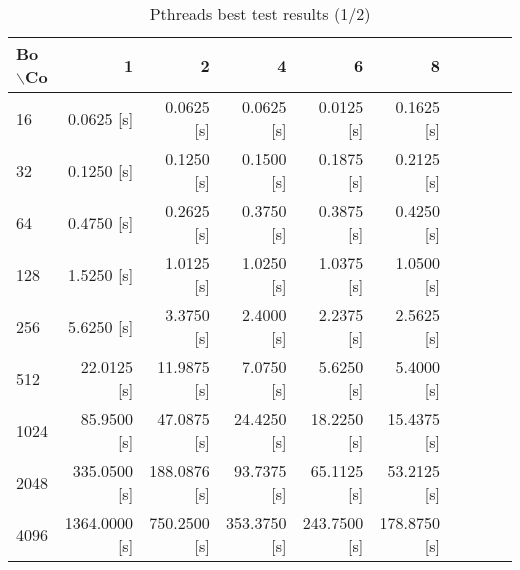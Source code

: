     \begin{table}[h!]
        \centering
        \small
        \begin{tabular}{|l|r|r|r|r|r|r|r|r|r|}
            \hline
            Bo $\backslash$Co & 1             & 2            & 4            & 6            & 8             \\\hline
            16                & 0.0625 [s]    & 0.0625 [s]   & 0.0625 [s]   & 0.0125 [s]   & 0.1625 [s]    \\\hline
            32                & 0.1250 [s]    & 0.1250 [s]   & 0.1500 [s]   & 0.1875 [s]   & 0.2125 [s]    \\\hline
            64                & 0.4750 [s]    & 0.2625 [s]   & 0.3750 [s]   & 0.3875 [s]   & 0.4250 [s]    \\\hline
            128               & 1.5250 [s]    & 1.0125 [s]   & 1.0250 [s]   & 1.0375 [s]   & 1.0500 [s]    \\\hline
            256               & 5.6250 [s]    & 3.3750 [s]   & 2.4000 [s]   & 2.2375 [s]   & 2.5625 [s]    \\\hline
            512               & 22.0125 [s]   & 11.9875 [s]  & 7.0750 [s]   & 5.6250 [s]   & 5.4000 [s]    \\\hline
            1024              & 85.9500 [s]   & 47.0875 [s]  & 24.4250 [s]  & 18.2250 [s]  & 15.4375 [s]   \\\hline
            2048              & 335.0500 [s]  & 188.0876 [s] & 93.7375 [s]  & 65.1125 [s]  & 53.2125 [s]   \\\hline
            4096              & 1364.0000 [s] & 750.2500 [s] & 353.3750 [s] & 243.7500 [s] & 178.8750 [s]  \\\hline
        \end{tabular}
        \caption{Pthreads best test results (1/2)}
        \label{tab:pthreads}
    \end{table}

